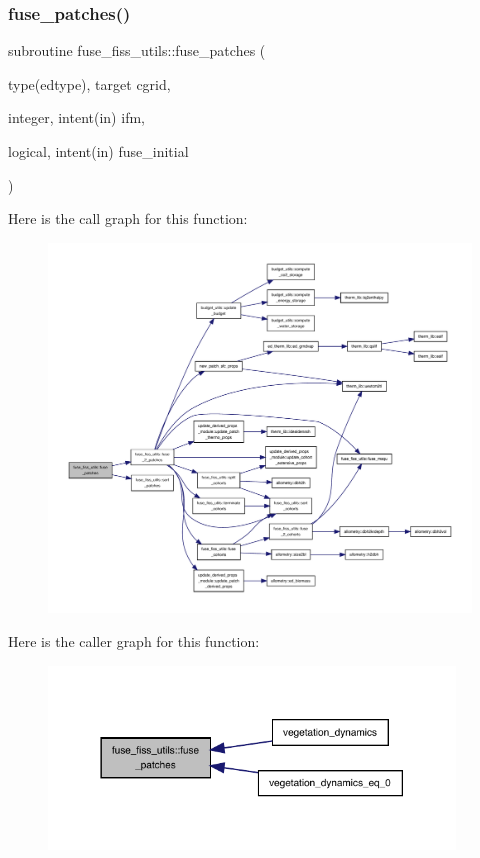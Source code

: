 \subsubsection{\texorpdfstring{fuse\+\_\+patches()}{fuse\_patches()}}
{\footnotesize\ttfamily subroutine fuse\+\_\+fiss\+\_\+utils\+::fuse\+\_\+patches (\begin{DoxyParamCaption}\item[{type(edtype), target}]{cgrid,  }\item[{integer, intent(in)}]{ifm,  }\item[{logical, intent(in)}]{fuse\+\_\+initial }\end{DoxyParamCaption})}

Here is the call graph for this function\+:
\nopagebreak
\begin{figure}[H]
\begin{center}
\leavevmode
\includegraphics[width=350pt]{namespacefuse__fiss__utils_aee30640ff825246fb4c9f5f1f41470be_cgraph}
\end{center}
\end{figure}
Here is the caller graph for this function\+:
\nopagebreak
\begin{figure}[H]
\begin{center}
\leavevmode
\includegraphics[width=306pt]{namespacefuse__fiss__utils_aee30640ff825246fb4c9f5f1f41470be_icgraph}
\end{center}
\end{figure}
\mbox{\label{namespacefuse__fiss__utils_ab3b0eeed8a63cc2f4b866ac243e25ec6}} 

